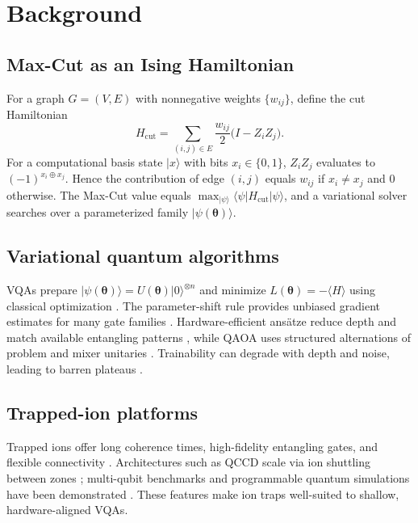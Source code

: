 \section{Background}
\subsection{Max-Cut as an Ising Hamiltonian}
For a graph $G=(V,E)$ with nonnegative weights $\{w_{ij}\}$, define the cut Hamiltonian
\begin{equation}
    H_{\mathrm{cut}} = \sum_{(i,j)\in E} \frac{w_{ij}}{2}\bigl(I - Z_i Z_j\bigr).
\end{equation}
For a computational basis state $|x\rangle$ with bits $x_i\in\{0,1\}$, $Z_iZ_j$ evaluates to $(-1)^{x_i\oplus x_j}$. Hence the contribution of edge $(i,j)$ equals $w_{ij}$ if $x_i \neq x_j$ and $0$ otherwise. The Max-Cut value equals $\max_{|\psi\rangle} \langle \psi| H_{\mathrm{cut}}|\psi\rangle$, and a variational solver searches over a parameterized family $|\psi(\boldsymbol{\theta})\rangle$.

\subsection{Variational quantum algorithms}
VQAs prepare $|\psi(\boldsymbol{\theta})\rangle = U(\boldsymbol{\theta})|0\rangle^{\otimes n}$ and minimize $L(\boldsymbol{\theta})=-\langle H\rangle$ using classical optimization \cite{peruzzo2014vqe,cerezo2021variational}. The parameter-shift rule provides unbiased gradient estimates for many gate families \cite{schuld2019gradients,mitarai2018quantum}. Hardware-efficient ans\"atze reduce depth and match available entangling patterns \cite{kandala2017hardware}, while QAOA uses structured alternations of problem and mixer unitaries \cite{farhi2014qaoa,hadfield2019qaoaops}. Trainability can degrade with depth and noise, leading to barren plateaus \cite{mcclean2018barren,arrasmith2021trainability,wang2021noiseplateaus}.

\subsection{Trapped-ion platforms}
Trapped ions offer long coherence times, high-fidelity entangling gates, and flexible connectivity \cite{bruzewicz2019trappedion}. Architectures such as QCCD scale via ion shuttling between zones \cite{pino2021qccd}; multi-qubit benchmarks and programmable quantum simulations have been demonstrated \cite{wright2019benchmarking,zhang2017iontrap}. These features make ion traps well-suited to shallow, hardware-aligned VQAs.

